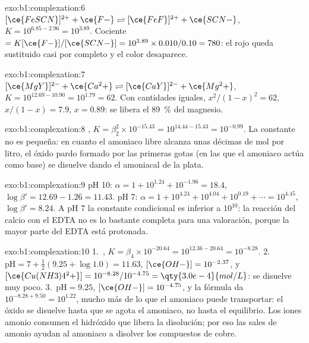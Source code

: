 \begin{solution}{exo:b1:complexation:6}
$[\ce{FeSCN}]^{2+} + \ce{F-} \rightleftharpoons [\ce{FeF}]^{2+} + \ce{SCN-}$,
$K = 10^{6.85 - 2.96} = 10^{3.89}$. Cociente $= K[\ce{F-}]/[\ce{SCN-}] =
10^{3.89} \times 0.010/0.10 = 780$: el  rojo queda sustituido
casi por completo y el color desaparece.
\end{solution}

\begin{solution}{exo:b1:complexation:7}
$[\ce{MgY}]^{2-} + \ce{Ca^2+} \rightleftharpoons [\ce{CaY}]^{2-} + \ce{Mg^2+}$,
$K = 10^{12.69 - 10.90} = 10^{1.79} = 62$. Con cantidades iguales,
$x^2/(1 - x)^2 = 62$, $x/(1 - x) = 7.9$, $x = 0.89$: se libera el
\qty{89}{\percent} del magnesio.
\end{solution}

\begin{solution}{exo:b1:complexation:8}
, $K = \beta_2^2 \times
10^{-15.43} = 10^{14.44 - 15.43} = 10^{-0.99}$. La constante no es
pequeña: en cuanto el amoniaco libre alcanza unas décimas de mol por
litro, el óxido pardo formado por las primeras gotas (en las que el
amoniaco actúa como base) se disuelve dando el  amoniacal de la
plata.
\end{solution}

\begin{solution}{exo:b1:complexation:9}
pH 10: $\alpha = 1 + 10^{1.24} + 10^{-1.96} = 18.4$, $\log\beta' = 12.69 -
1.26 = 11.43$. pH 7: $\alpha = 1 + 10^{4.24} + 10^{4.04} + 10^{0.19} +
\cdots = 10^{4.45}$, $\log\beta' = 8.24$. A pH 7 la constante condicional
es inferior a $10^{10}$: la reacción del calcio con el EDTA no es lo
bastante completa para una valoración, porque la mayor parte del EDTA está
protonada.
\end{solution}

\begin{solution}{exo:b1:complexation:10}
1.~, $K = \beta_4 \times
10^{-20.64} = 10^{12.36 - 20.64} = 10^{-8.28}$.
2.~$\mathrm{pH} = 7 + \frac12(9.25 + \log 1.0) = 11.63$, $[\ce{OH-}] =
10^{-2.37}$, y $[\ce{Cu(NH3)4^2+}] = 10^{-8.28}/10^{-4.75} =
\qty{3.0e-4}{mol/L}$: se disuelve muy poco.
3.~$\mathrm{pH} = 9.25$, $[\ce{OH-}] = 10^{-4.75}$, y la fórmula da
$10^{-8.28 + 9.50} = 10^{1.22}$, mucho más de lo que el amoniaco puede
transportar: el óxido se disuelve hasta que se agota el amoniaco, no
hasta el equilibrio. Los iones amonio consumen el hidróxido que libera la
disolución; por eso las sales de amonio ayudan al amoniaco a disolver los
compuestos de cobre.
\end{solution}

